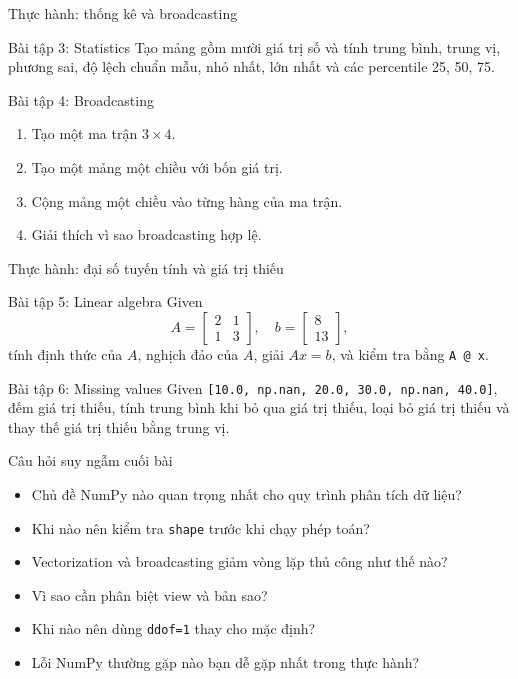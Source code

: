\documentclass[aspectratio=169,11pt]{beamer}
\begin{document}
\begin{frame}{Thực hành: thống kê và broadcasting}
\small
\begin{block}{Bài tập 3: Statistics}
Tạo mảng gồm mười giá trị số và tính trung bình, trung vị, phương sai, độ lệch chuẩn mẫu, nhỏ nhất, lớn nhất và các percentile 25, 50, 75.
\end{block}
\begin{block}{Bài tập 4: Broadcasting}
\begin{enumerate}
  \item Tạo một ma trận \(3 \times 4\).
  \item Tạo một mảng một chiều với bốn giá trị.
  \item Cộng mảng một chiều vào từng hàng của ma trận.
  \item Giải thích vì sao broadcasting hợp lệ.
\end{enumerate}
\end{block}
\end{frame}

\begin{frame}{Thực hành: đại số tuyến tính và giá trị thiếu}
\small
\begin{block}{Bài tập 5: Linear algebra}
Given
\[
A=\begin{bmatrix}2&1\\ 1&3\end{bmatrix},\quad b=\begin{bmatrix}8\\ 13\end{bmatrix},
\]
tính định thức của \(A\), nghịch đảo của \(A\), giải \(Ax=b\), và kiểm tra bằng \texttt{A @ x}.
\end{block}
\begin{block}{Bài tập 6: Missing values}
Given \texttt{[10.0, np.nan, 20.0, 30.0, np.nan, 40.0]}, đếm giá trị thiếu, tính trung bình khi bỏ qua giá trị thiếu, loại bỏ giá trị thiếu và thay thế giá trị thiếu bằng trung vị.
\end{block}
\end{frame}

\begin{frame}{Câu hỏi suy ngẫm cuối bài}
\small
\begin{itemize}
  \item Chủ đề NumPy nào quan trọng nhất cho quy trình phân tích dữ liệu?
  \item Khi nào nên kiểm tra \texttt{shape} trước khi chạy phép toán?
  \item Vectorization và broadcasting giảm vòng lặp thủ công như thế nào?
  \item Vì sao cần phân biệt view và bản sao?
  \item Khi nào nên dùng \texttt{ddof=1} thay cho mặc định?
  \item Lỗi NumPy thường gặp nào bạn dễ gặp nhất trong thực hành?
\end{itemize}
\end{frame}
\end{document}
